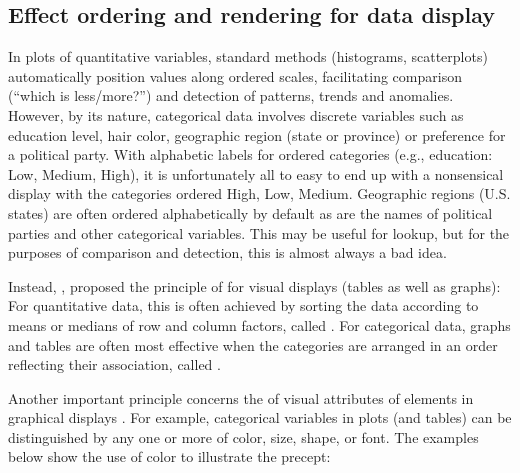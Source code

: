 \documentclass[10pt,krantz2]{krantz}\usepackage[]{graphicx}\usepackage[]{color}
\begin{document}

\subsection{Effect ordering and rendering for data display}\label{sec:effect-order}

In plots of quantitative variables, standard methods
(histograms, scatterplots) automatically position values along
ordered scales, facilitating comparison (``which is less/more?'')
and detection of patterns, trends and anomalies.
However, by its nature, categorical data involves discrete variables such as
education level, hair color, geographic region (state or province)
or preference for a political party.
With alphabetic labels for ordered
categories (e.g., education: Low, Medium, High), it is unfortunately all to
easy to end up with a nonsensical display with the categories
ordered High, Low, Medium.  Geographic regions (U.S. states) are often
ordered alphabetically by default as are the names of political parties
and other categorical variables.  This may be useful for lookup, but
for the purposes of comparison
and detection, this is almost always a bad idea.

Instead, \citet{FriendlyKwan:02:effect}, proposed the principle of
 for visual displays (tables as well as graphs):
For quantitative data, this is often achieved by sorting the
data according to means or medians of row and column factors,
called .
For categorical data, graphs and tables are often most effective
when the categories are arranged in an order reflecting their
association, called .

Another important principle concerns the
 of visual attributes of
elements in graphical displays
\citep{Friendly:02:corrgram}.  For example, categorical variables in plots (and tables)
can be distinguished by any one or more of color, size, shape, or font.
The examples below show the use of color to illustrate the precept:
\end{document}
